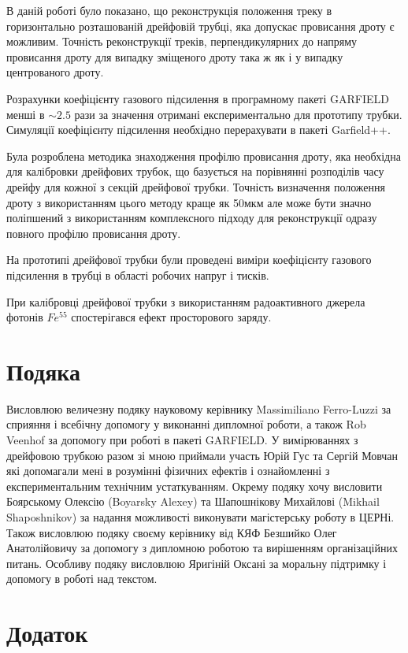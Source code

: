 \documentclass[pdftex,14pt]{scrartcl}
\begin{document}
\begin{spacing}{1.5}
	В даній роботі було показано, що реконструкція положення треку в горизонтально розташованій дрейфовій трубці, яка допускає провисання дроту є можливим. Точність реконструкції треків, перпендикулярних до напряму провисання дроту для випадку зміщеного дроту така ж як і  у випадку центрованого дроту.
	
	Розрахунки коефіцієнту газового підсилення в програмному пакеті GARFIELD менші в $\sim 2.5$ рази за значення отримані експериментально для прототипу трубки. Симуляції коефіцієнту підсилення необхідно перерахувати в пакеті Garfield++. 
	
	Була розроблена методика знаходження профілю провисання дроту, яка необхідна для калібровки дрейфових трубок, що базується на порівнянні розподілів часу дрейфу для кожної з секцій дрейфової трубки. Точність визначення положення дроту з використанням цього методу краще як 50мкм але може бути значно поліпшений з використанням комплексного підходу для реконструкції одразу повного профілю провисання дроту.
	
	На прототипі дрейфової трубки були проведені виміри коефіцієнту газового підсилення в трубці в області робочих напруг і тисків. 
	
	При калібровці дрейфової трубки з використанням радоактивного джерела фотонів $Fe^{55}$ спостерігався ефект просторового заряду.
	
\section{ Подяка}

	
	Висловлюю величезну подяку науковому керівнику Massimiliano  Ferro-Luzzi за сприяння і всебічну допомогу у виконанні дипломної роботи, а також Rob Veenhof за допомогу при роботі в пакеті GARFIELD. У вимірюваннях з дрейфовою трубкою разом зі мною приймали участь Юрій Гус та Сергій Мовчан які допомагали мені в розумінні фізичних ефектів і ознайомленні з експериментальним технічним устаткуванням.
	Окрему подяку хочу висловити Боярському Олексію (Boyarsky Alexey) та Шапошнікову Михайлові (Mikhail Shaposhnikov) за надання можливості виконувати магістерську роботу в ЦЕРНі.
	Також висловлюю подяку своєму керівнику від КЯФ Безшийко Олег Анатолійовичу за допомогу з дипломною роботою та вирішенням організаційних питань.
	Особливу подяку висловлюю Яригіній Оксані за моральну підтримку і допомогу в роботі над текстом.
		
\newpage
\section{Додаток}


\end{spacing}
\end{document}
